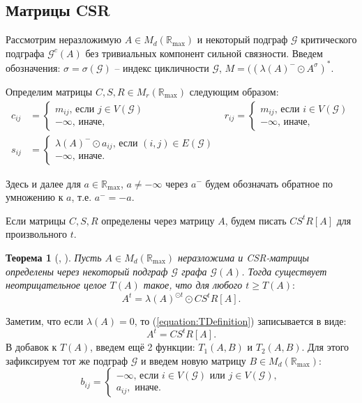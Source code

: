 \documentclass[12pt]{article}
\newtheorem{theorem}{Теорема}[section]
\begin{document}
\subsection{Матрицы CSR}
\label{subsection:CSR}
Рассмотрим неразложимую $A \in M_d(\mathbb{R}_{\max})$ и некоторый подграф $\mathcal{G}$ критического подграфа $\mathcal{G}^c(A)$ без тривиальных компонент сильной связности. Введем обозначения: $\sigma = \sigma(\mathcal{G})$ -- индекс цикличности $\mathcal{G}$, $M = ((\lambda(A)^-\odot A^\sigma)^*$.

Определим матрицы $C, S, R \in M_r(\mathbb{R}_{\max})$ следующим образом:
\begin{align*}
    c_{ij} &= \begin{cases}
        m_{ij}\text{, если } j \in V(\mathcal{G})\\
        -\infty \text{, иначе,}
    \end{cases}
    &
    r_{ij} = \begin{cases}
        m_{ij}\text{, если } i \in V(\mathcal{G})\\
        -\infty \text{, иначе,}
    \end{cases}
    \\
    s_{ij} &= \begin{cases}
        \lambda(A)^- \odot a_{ij}\text{, если } (i, j) \in E(\mathcal{G})\\
        -\infty \text{, иначе.}
    \end{cases}
\end{align*}

Здесь и далее для $a \in \mathbb{R}_{\max}$, $a \ne -\infty$ через $a^-$ будем обозначать обратное по умножению к $a$, т.е. $a^- = -a$.

Если матрицы $C, S, R$ определены через матрицу $A$, будем писать $CS^tR[A]$ для произвольного $t$.
\begin{theorem}[\cite{bounds}, \cite{15WeakCSRExpantion}]
\label{theorem:CSRdecompositionTheorem}
Пусть $A \in M_d(\mathbb{R}_{\max})$ неразложима и CSR-матрицы определены через некоторый подграф $\mathcal{G}$ графа $\mathcal{G}(A)$. Тогда существует неотрицательное целое $T(A)$ такое, что для любого $t \ge T(A):$
\begin{equation}
\label{equation:TDefinition}
    A^t = \lambda(A)^{\odot t} \odot CS^tR[A].
\end{equation}
\end{theorem}

Заметим, что если $\lambda(A) = 0$, то (\ref{equation:TDefinition}) записывается в виде:
\begin{equation}
    A^t = CS^tR[A].
\end{equation}
В добавок к $T(A)$, введем ещё 2 функции: $T_1(A, B)$ и $T_2(A, B)$. Для этого зафиксируем тот же подграф $\mathcal{G}$ и введем новую матрицу $B \in M_d(\mathbb{R}_{\max})$:
\begin{equation*}
    b_{ij} = 
    \begin{cases}
        -\infty \text{, если $i \in V(\mathcal{G})$ или $j\in V(\mathcal{G})$}, \\
        a_{ij}, \text{ иначе.}
    \end{cases}
\end{equation*}
\end{document}
